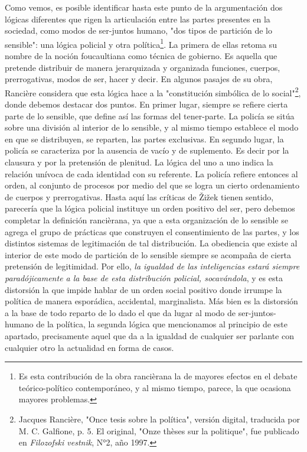Como vemos, es posible identificar hasta este punto de la argumentación
dos lógicas diferentes que rigen la articulación entre las partes
presentes en la sociedad, como modos de ser-juntos humano, "dos tipos de
partición de lo sensible": una lógica policial y otra
política\footnote{Es esta contribución de la obra rancièrana la de
  mayores efectos en el debate teórico-político contemporáneo, y al
  mismo tiempo, parece, la que ocasiona mayores problemas.}. La primera
de ellas retoma su nombre de la noción foucaultiana como técnica de
gobierno. Es aquella que pretende distribuir de manera jerarquizada y
organizada funciones, cuerpos, prerrogativas, modos de ser, hacer y
decir. En algunos pasajes de su obra, Rancière considera que esta lógica
hace a la "constitución simbólica de lo social"\footnote{Jacques
  Rancière, "Once tesis sobre la política", versión digital, traducida
  por M. C. Galfione, p. 5. El original, "Onze thèses sur la politique",
  fue publicado en \emph{Filozofski vestnik}, N°2, año 1997.}, donde
debemos destacar dos puntos. En primer lugar, siempre se refiere cierta
parte de lo sensible, que define así las formas del tener-parte. La
policía se sitúa sobre una división al interior de lo sensible, y al
mismo tiempo establece el modo en que se distribuyen, se reparten, las
partes exclusivas. En segundo lugar, la policía se caracteriza por la
ausencia de vacío y de suplemento. Es decir por la clausura y por la
pretensión de plenitud. La lógica del uno a uno indica la relación
unívoca de cada identidad con su referente. La policía refiere entonces
al orden, al conjunto de procesos por medio del que se logra un cierto
ordenamiento de cuerpos y prerrogativas. Hasta aquí las críticas de
Žižek tienen sentido, parecería que la lógica policial instituye un
orden positivo del ser, pero debemos completar la definición rancièrana,
ya que a esta organización de lo sensible se agrega el grupo de
prácticas que construyen el consentimiento de las partes, y los
distintos sistemas de legitimación de tal distribución. La obediencia
que existe al interior de este modo de partición de lo sensible siempre
se acompaña de cierta pretensión de legitimidad. Por ello, \emph{la
igualdad de las inteligencias estará siempre paradójicamente a la base
de esta distribución policial, socavándola}, y es esta distorsión la que
impide hablar de un orden social positivo donde irrumpe la política de
manera esporádica, accidental, marginalista. Más bien es la distorsión a
la base de todo reparto de lo dado el que da lugar al modo de
ser-juntos-humano de la política, la segunda lógica que mencionamos al
principio de este apartado, precisamente aquel que da a la igualdad de
cualquier ser parlante con cualquier otro la actualidad en forma de
casos.

